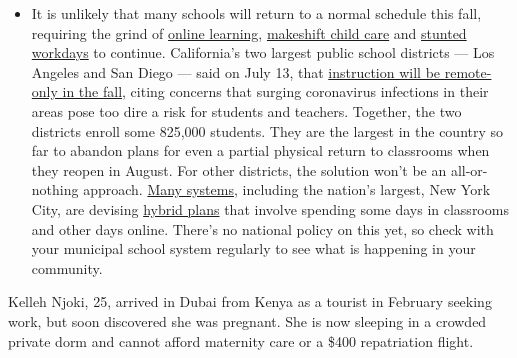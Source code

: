 \begin{itemize}
  \begin{itemize}
  \tightlist
  \item
    It is unlikely that many schools will return to a normal schedule
    this fall, requiring the grind of
    \href{https://www.nytimes.com/2020/06/05/us/coronavirus-education-lost-learning.html?action=click\&pgtype=Article\&state=default\&region=MAIN_CONTENT_3\&context=storylines_faq}{online
    learning},
    \href{https://www.nytimes.com/2020/05/29/us/coronavirus-child-care-centers.html?action=click\&pgtype=Article\&state=default\&region=MAIN_CONTENT_3\&context=storylines_faq}{makeshift
    child care} and
    \href{https://www.nytimes.com/2020/06/03/business/economy/coronavirus-working-women.html?action=click\&pgtype=Article\&state=default\&region=MAIN_CONTENT_3\&context=storylines_faq}{stunted
    workdays} to continue. California's two largest public school
    districts --- Los Angeles and San Diego --- said on July 13, that
    \href{https://www.nytimes.com/2020/07/13/us/lausd-san-diego-school-reopening.html?action=click\&pgtype=Article\&state=default\&region=MAIN_CONTENT_3\&context=storylines_faq}{instruction
    will be remote-only in the fall}, citing concerns that surging
    coronavirus infections in their areas pose too dire a risk for
    students and teachers. Together, the two districts enroll some
    825,000 students. They are the largest in the country so far to
    abandon plans for even a partial physical return to classrooms when
    they reopen in August. For other districts, the solution won't be an
    all-or-nothing approach.
    \href{https://bioethics.jhu.edu/research-and-outreach/projects/eschool-initiative/school-policy-tracker/}{Many
    systems}, including the nation's largest, New York City, are
    devising
    \href{https://www.nytimes.com/2020/06/26/us/coronavirus-schools-reopen-fall.html?action=click\&pgtype=Article\&state=default\&region=MAIN_CONTENT_3\&context=storylines_faq}{hybrid
    plans} that involve spending some days in classrooms and other days
    online. There's no national policy on this yet, so check with your
    municipal school system regularly to see what is happening in your
    community.
  \end{itemize}
\end{itemize}

Kelleh Njoki, 25, arrived in Dubai from Kenya as a tourist in February
seeking work, but soon discovered she was pregnant. She is now sleeping
in a crowded private dorm and cannot afford maternity care or a \$400
repatriation flight.

